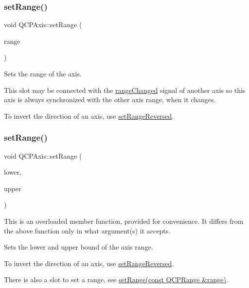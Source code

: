 \subsubsection{\texorpdfstring{set\+Range()}{setRange()}\hspace{0.1cm}{\footnotesize\ttfamily [1/3]}}
{\footnotesize\ttfamily void Q\+C\+P\+Axis\+::set\+Range (\begin{DoxyParamCaption}\item[{const \hyperlink{class_q_c_p_range}{Q\+C\+P\+Range} \&}]{range }\end{DoxyParamCaption})}

Sets the range of the axis.

This slot may be connected with the \hyperlink{class_q_c_p_axis_a0894084e4c16a1736534c4095746f910}{range\+Changed} signal of another axis so this axis is always synchronized with the other axis range, when it changes.

To invert the direction of an axis, use \hyperlink{class_q_c_p_axis_a2172fdb196b1a0dc3f40992fcad8e9e1}{set\+Range\+Reversed}. \mbox{\label{class_q_c_p_axis_a57d6ee9e9009fe88cb19db476ec70bca}} 
\subsubsection{\texorpdfstring{set\+Range()}{setRange()}\hspace{0.1cm}{\footnotesize\ttfamily [2/3]}}
{\footnotesize\ttfamily void Q\+C\+P\+Axis\+::set\+Range (\begin{DoxyParamCaption}\item[{double}]{lower,  }\item[{double}]{upper }\end{DoxyParamCaption})}

This is an overloaded member function, provided for convenience. It differs from the above function only in what argument(s) it accepts.

Sets the lower and upper bound of the axis range.

To invert the direction of an axis, use \hyperlink{class_q_c_p_axis_a2172fdb196b1a0dc3f40992fcad8e9e1}{set\+Range\+Reversed}.

There is also a slot to set a range, see \hyperlink{class_q_c_p_axis_aebdfea5d44c3a0ad2b4700cd4d25b641}{set\+Range(const Q\+C\+P\+Range \&range)}. \mbox{\label{class_q_c_p_axis_acf60e5b2d631fbc8c4548c3d579cb6d0}} 
